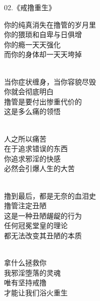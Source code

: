 \begin{center}
    02.《戒撸重生》\it
    \begin{multicols}{2}
        你的纯真消失在撸管的岁月里 \\ 你的猥琐和自卑与日俱增 \\ 你的瘾一天天强化 \\ 而你的身体却一天天垮掉

        ~\\

        当你症状缠身，当你容貌尽毁 \\ 你就会彻底明白 \\ 撸管是要付出惨重代价的 \\ 这是多么痛的领悟

        ~\\

        人之所以痛苦 \\ 在于追求错误的东西 \\ 你追求邪淫的快感 \\ 必然会引爆人生的大苦

        ~\\

        撸到最后，都是无奈的血泪史 \\ 撸管注定丑陋 \\ 这是一种丑陋龌龊的行为 \\ 任何冠冕堂皇的理论 \\ 都无法改变其丑陋的本质

        ~\\

        拿什么拯救你 \\ 我邪淫堕落的灵魂 \\ 唯有坚持戒撸 \\ 才能让我们浴火重生
    \end{multicols}
\end{center}

